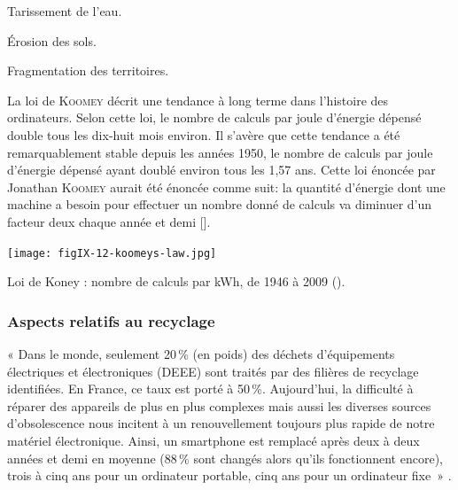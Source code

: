 
\begin{jazzitemize}
\item Tarissement de l’eau.
\item Érosion des sols.
\item Fragmentation des territoires.
\end{jazzitemize}


La loi de \textsc{Koomey} décrit une tendance à long terme dans l'histoire des ordinateurs. Selon cette loi, le nombre de calculs par joule d'énergie dépensé double tous les dix-huit mois environ. Il s'avère que cette tendance a été remarquablement stable depuis les années 1950, le nombre de calculs par joule d'énergie dépensé ayant doublé environ tous les 1,57 ans. Cette loi énoncée par Jonathan \textsc{Koomey} aurait été énoncée comme suit: la quantité d'énergie dont une machine a besoin pour effectuer un nombre donné de calculs va diminuer d'un facteur deux chaque année et demi [\href{https://fr.wikipedia.org/wiki/Loi_de_Koomey}{\faWikipediaW}].

\begin{marginfigure}
\texttt{[image: figIX-12-koomeys-law.jpg]}
\caption{\label{fig:IX.12}Loi de Koney : nombre de calculs par kWh, de 1946 à 2009 (\href{https://fr.wikipedia.org/wiki/Loi_de_Koomey}{\normalfont\faWikipediaW}).}
\end{marginfigure}

\subsubsection[Aspects de recyclage]{Aspects relatifs au recyclage}
\label{subsub:IX.4.2.3}


« Dans le monde, seulement 20\,\% (en poids) des déchets d’équipements électriques et  électroniques (DEEE) sont traités par des filières de recyclage identifiées. En France, ce taux est porté à 50\,\%. Aujourd’hui, la difficulté à réparer des appareils de plus en plus complexes mais aussi les diverses sources d’obsolescence nous incitent à un renouvellement toujours plus rapide de notre matériel électronique. Ainsi, un smartphone est remplacé après deux à deux années et demi en moyenne (88\,\% sont changés alors qu’ils fonctionnent encore), trois à cinq ans pour un ordinateur portable, cinq ans pour un ordinateur fixe~» \parencite{Marquet-et-al:2019}.

